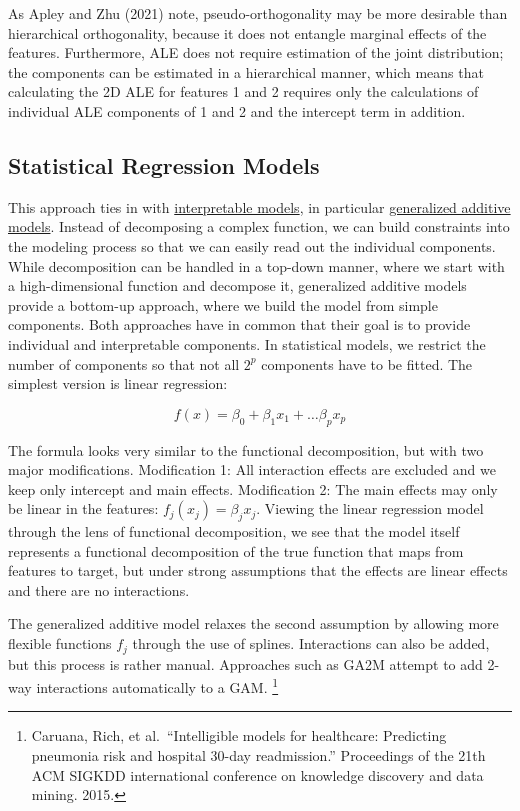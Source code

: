 \documentclass[
  12pt,
]{krantz}
\begin{document}
As Apley and Zhu (2021) note, pseudo-orthogonality may be more desirable than hierarchical orthogonality, because it does not entangle marginal effects of the features.
Furthermore, ALE does not require estimation of the joint distribution; the components can be estimated in a hierarchical manner, which means that calculating the 2D ALE for features 1 and 2 requires only the calculations of individual ALE components of 1 and 2 and the intercept term in addition.

\hypertarget{statistical-regression-models}{%
\subsection{Statistical Regression Models}\label{statistical-regression-models}}

This approach ties in with \protect\hyperlink{simple}{interpretable models}, in particular \protect\hyperlink{extend-lm}{generalized additive models}.
Instead of decomposing a complex function, we can build constraints into the modeling process so that we can easily read out the individual components.
While decomposition can be handled in a top-down manner, where we start with a high-dimensional function and decompose it, generalized additive models provide a bottom-up approach, where we build the model from simple components.
Both approaches have in common that their goal is to provide individual and interpretable components.
In statistical models, we restrict the number of components so that not all \(2^p\) components have to be fitted.
The simplest version is linear regression:

\[f(x) = \beta_0 + \beta_1 x_1 + \ldots \beta_p x_p\]

The formula looks very similar to the functional decomposition, but with two major modifications.
Modification 1: All interaction effects are excluded and we keep only intercept and main effects.
Modification 2: The main effects may only be linear in the features: \(f_j(x_j)=\beta_j{}x_j\).
Viewing the linear regression model through the lens of functional decomposition, we see that the model itself represents a functional decomposition of the true function that maps from features to target, but under strong assumptions that the effects are linear effects and there are no interactions.

The generalized additive model relaxes the second assumption by allowing more flexible functions \(f_j\) through the use of splines.
Interactions can also be added, but this process is rather manual.
Approaches such as GA2M attempt to add 2-way interactions automatically to a GAM. \footnote{Caruana, Rich, et al.~``Intelligible models for healthcare: Predicting pneumonia risk and hospital 30-day readmission.'' Proceedings of the 21th ACM SIGKDD international conference on knowledge discovery and data mining. 2015.}
\end{document}
